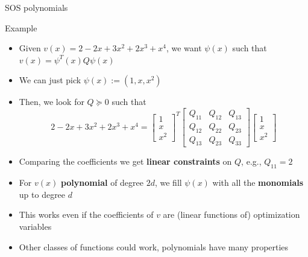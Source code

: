 \documentclass[aspectratio=169]{beamer}
\begin{document}
\begin{frame}{SOS polynomials}
\begin{block}{Example}
\begin{itemize}
\item
Given $v(x) = 2 - 2 x + 3 x^2 + 2 x^3 + x^4$, we want $\psi(x)$ such that $v(x) = \psi^T(x) Q \psi(x)$
\item
We can just pick $\psi(x) := (1, x, x^2)$
\item
Then, we look for $Q \succeq 0$ such that
\vspace{-5mm}
$$
2 - 2 x + 3 x^2 + 2 x^3 + x^4 =
\begin{bmatrix} 1 \\ x \\ x^2 \end{bmatrix}^T
\begin{bmatrix} Q_{11} & Q_{12} & Q_{13} \\ Q_{12} & Q_{22} & Q_{23} \\ Q_{13} & Q_{23} & Q_{33} \end{bmatrix}
\begin{bmatrix} 1 \\ x \\ x^2 \end{bmatrix}
$$
\item
Comparing the coefficients we get \textbf{linear constraints} on $Q$, e.g., $Q_{11} = 2$
\end{itemize}
\end{block}
\pause
\begin{itemize}
\item
For $v(x)$ \textbf{polynomial} of degree $2d$, we fill $\psi(x)$ with all the \textbf{monomials} up to degree $d$
\pause
\item
This works even if the coefficients of $v$ are (linear functions of) optimization variables
\pause
\item
Other classes of functions could work, polynomials have many properties
\end{itemize}
\end{frame}
\end{document}
